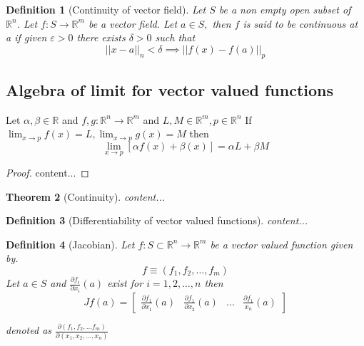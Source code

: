 \documentclass[oneside,11pt,pdftex]{book}%
\numberwithin{equation}{section}
\newtheorem{theorem}{Theorem}[chapter]%
\newtheorem{definition}[theorem]{Definition}
\numberwithin{section}{chapter}
\numberwithin{equation}{chapter}
\newcommand{\R}{\mathbb{R}}
\begin{document}
\begin{definition}[Continuity of vector field]
	Let $ S $ be a non empty open subset of $ \R^n $. Let $ f:S\rightarrow \R^m $ be a vector field.
	Let $ a\in S,$ then $ f $ is said to be continuous at a if given $ \varepsilon>0 $ there exists $ \delta >0 $ such that
	\[ ||x-a||_n<\delta \implies ||f(x)-f(a)||_p\]	
\end{definition}

\subsection{Algebra of limit for vector valued functions}
Let $ \alpha,\beta \in \R  $ and $ f,g:\R^n \rightarrow \R^m $ and $ L,M \in \R^m, p \in \R^n $
If $ \lim_{x\rightarrow p} f(x) =L, \lim_{x \to p} g(x)=M$ then \[ \lim_{x\to p} [\alpha f(x)+\beta(x)]=\alpha L+ \beta M \]
\begin{proof}
	content...
\end{proof}

\begin{theorem}[Continuity]
	content...
\end{theorem}
\begin{definition}[Differentiability of vector valued functions]	
	content...
\end{definition}
\begin{definition}[Jacobian]
	Let $ f:S \subset \R^n \rightarrow \R^m $ be a vector valued function given by.
	\[ f\equiv (f_1,f_2,\dots,f_m) \] Let $ a \in S $ and $ \frac{\partial f_i}{\partial x_i} (a)$ exist for $ i=1,2,\dots,n $ then 
	\[ Jf(a)=\begin{bmatrix}
		\frac{\partial f_1}{\partial x_1}(a) & \frac{\partial f_1}{\partial x_2}(a) & \dots & \frac{\partial f_1}{x_n}(a)
	\end{bmatrix}\]

	denoted as $ \frac{\partial (f_1,f_2,\dots f_m)}{\partial(x_1,x_2,\dots,x_n)} $
\end{definition}
\end{document}
